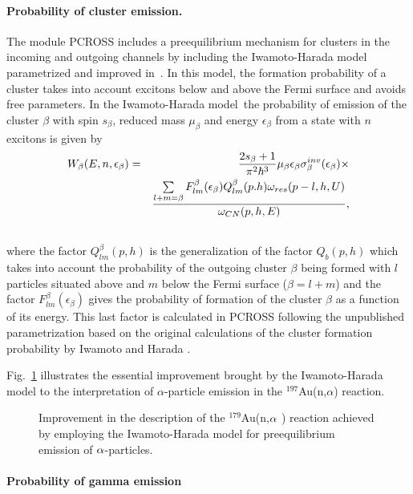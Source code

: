 \paragraph{Probability of cluster emission.}

The module PCROSS includes a preequilibrium mechanism for clusters in the
incoming and outgoing channels by including the Iwamoto-Harada model~\cite%
{Iwamoto:82} parametrized and improved in~\cite{Sato:83,Shang:88,Shang:89}.
In this model, the formation probability of a cluster takes into account
excitons below and above the Fermi surface and avoids free parameters. In
the Iwamoto-Harada model~the probability of emission of the cluster $\beta $
with spin $s_{\beta }$, reduced mass $\mu _{\beta }$ and energy $\epsilon
_{\beta }$ from a state with $n$ excitons is given by%
\begin{eqnarray}
W_{\beta }(E,n,\epsilon _{\beta })&=&\frac{2s_{\beta }+1}{\pi ^{2}\hbar ^{3}}%
\mu _{\beta }\epsilon _{\beta }\sigma _{\beta }^{inv}(\epsilon _{\beta
})\times  \notag \\
&&\frac{\sum\limits_{l+m=\beta }F_{lm}^{\beta }(\epsilon _{\beta
})Q_{lm}^{\beta }(p.h)\omega _{res}(p-l,h,U)}{\omega _{CN}(p,h,E)},  \notag \\
&&
\end{eqnarray}%
where the factor $Q_{lm}^{\beta }(p,h)$ is the generalization of the factor $%
Q_{b}(p,h)$ which takes into account the probability of the outgoing cluster
$\beta $ being formed with $l$ particles situated above and $m$ below the
Fermi surface ($\beta =l+m$) \cite{Shang:89} and the factor $F_{lm}^{\beta
}(\epsilon _{\beta })$ gives the probability of formation of the cluster $%
\beta $ as a function of its energy. This last factor is calculated in
PCROSS following the unpublished parametrization based on the original
calculations of the cluster formation probability by Iwamoto and Harada \cite%
{Iwamoto:82}.

Fig.~\ref{goldna} illustrates the essential improvement brought by the
Iwamoto-Harada model to the interpretation of $\alpha$-particle emission
in the $^{197}$Au(n,$\alpha $) reaction.
\begin{figure}[tbph]
\caption{Improvement in the description of the $^{179}$Au(n,$\protect\alpha $%
) reaction achieved by employing the Iwamoto-Harada model for preequilibrium
emission of $\protect\alpha $-particles.}
\label{goldna}
\end{figure}

\paragraph{Probability of gamma emission}

